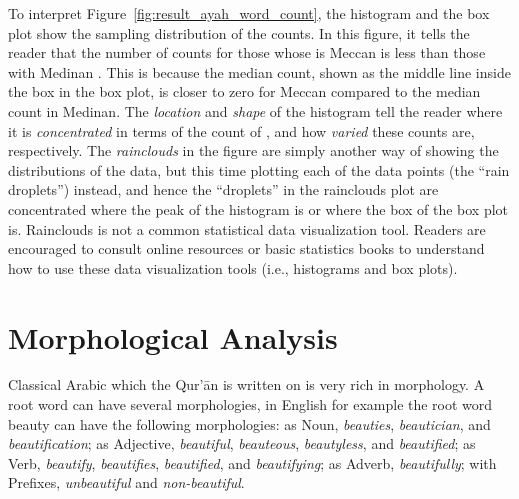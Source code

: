 To interpret Figure~\ref{fig:result_ayah_word_count}, the histogram and the box plot show the sampling distribution of the   counts. In this figure, it tells the reader that the number of   counts for those whose   is Meccan is less than those with Medinan  . This is because the median count, shown as the middle line inside the box in the box plot, is closer to zero for Meccan compared to the median count in Medinan. The \textit{location} and \textit{shape} of the histogram tell the reader where it is \textit{concentrated} in terms of the count of  , and how \textit{varied} these counts are, respectively. The \textit{rainclouds} in the figure are simply another way of showing the distributions of the data, but this time plotting each of the data points (the ``rain droplets'') instead, and hence the ``droplets'' in the rainclouds plot are concentrated where the peak of the histogram is or where the box of the box plot is. Rainclouds is not a common statistical data visualization tool. Readers are encouraged to consult online resources or basic statistics books to understand how to use these data visualization tools (i.e., histograms and box plots).

\section{Morphological Analysis} \label{sec:method_morph_analysis}
Classical Arabic which the Qur'\=an is written on is very rich in morphology. A root word can have several morphologies, in English for example the root word beauty can have the following morphologies: as Noun, \textit{beauties}, \textit{beautician}, and \textit{beautification}; as Adjective, \textit{beautiful}, \textit{beauteous}, \textit{beautyless}, and \textit{beautified}; as Verb, \textit{beautify}, \textit{beautifies}, \textit{beautified}, and \textit{beautifying}; as Adverb, \textit{beautifully}; with Prefixes, \textit{unbeautiful} and \textit{non-beautiful}.

